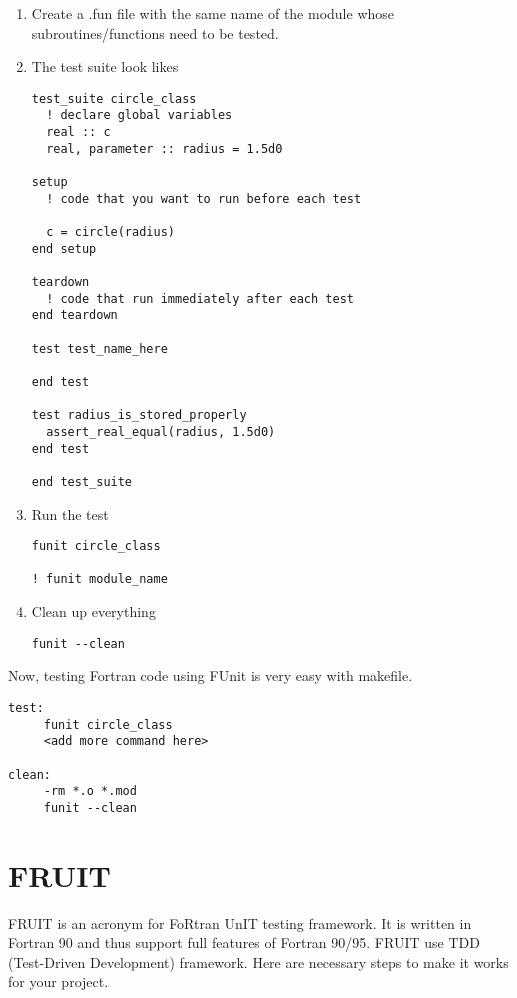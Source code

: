 \begin{enumerate}
\item Create a .fun file with the same name of the module  whose
  subroutines/functions need to be tested.

\item The test suite look likes
\begin{lstlisting}
test_suite circle_class
  ! declare global variables
  real :: c
  real, parameter :: radius = 1.5d0

setup
  ! code that you want to run before each test

  c = circle(radius)
end setup

teardown
  ! code that run immediately after each test
end teardown

test test_name_here

end test

test radius_is_stored_properly
  assert_real_equal(radius, 1.5d0)
end test

end test_suite
\end{lstlisting}

\item Run the test
\begin{lstlisting}
funit circle_class

! funit module_name
\end{lstlisting}

\item Clean up everything
\begin{lstlisting}
funit --clean
\end{lstlisting}

\end{enumerate}

Now, testing Fortran code using FUnit is very easy with makefile.
\begin{lstlisting}
test:
     funit circle_class
     <add more command here>

clean: 
     -rm *.o *.mod
     funit --clean
\end{lstlisting}


\section{FRUIT}
\label{sec:fruit}

FRUIT is an acronym for FoRtran UnIT testing framework. It is written
in Fortran 90 and thus support full features of Fortran 90/95. FRUIT
use TDD (Test-Driven Development) framework. Here are necessary steps
to make it works for your project.

